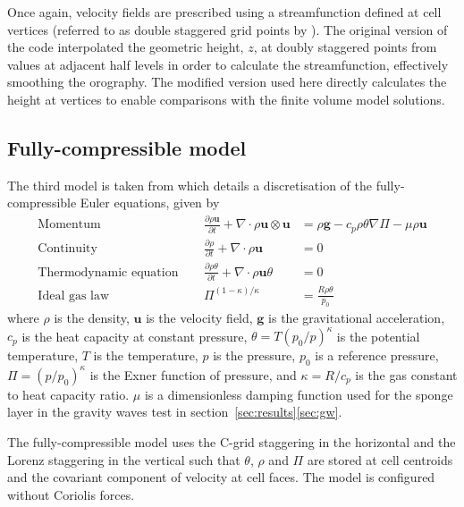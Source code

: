 \documentclass{ametsoc}
\begin{document}
Once again, velocity fields are prescribed using a streamfunction defined at cell vertices (referred to as double staggered grid points by \citet{schaer2002}).  The original version of the code interpolated the geometric height, $z$, at doubly staggered points from values at adjacent half levels in order to calculate the streamfunction, effectively smoothing the orography.  The modified version used here directly calculates the height at vertices to enable comparisons with the finite volume model solutions.

\subsection{Fully-compressible model}
\label{sec:euler-model}
The third model is taken from \citet{weller-shahrokhi2014} which details a discretisation of the fully-compressible Euler equations, given by
\begin{subequations}
\begin{align}
	\text{Momentum} &\ &\  	\frac{\partial \rho \mathbf{u}}{\partial t} + \nabla \cdot \rho \mathbf{u}\otimes\mathbf{u} &= \rho \mathbf{g} - c_p \rho \theta \nabla \Pi - \mu \rho \mathbf{u} \label{eq:momentum} \\
	\text{Continuity} &\ &\	\frac{\partial \rho}{\partial t} + \nabla \cdot \rho \mathbf{u} &= 0 \label{eq:cont} \\
	\text{Thermodynamic equation} &\ &\ \frac{\partial \rho \theta}{\partial t} + \nabla \cdot \rho \mathbf{u} \theta &= 0 \label{eq:theta} \\
	\text{Ideal gas law} &\ &\ \Pi^{(1 - \kappa)/\kappa} &= \frac{R \rho \theta}{p_0} \label{eq:state}
\end{align}
\end{subequations}
where \(\rho\) is the density, \(\mathbf{u}\) is the velocity field, \(\mathbf{g}\) is the gravitational acceleration, \(c_p\) is the heat capacity at constant pressure, \(\theta = T \left(p_0/p\right)^\kappa\) is the potential temperature, \(T\) is the temperature, \(p\) is the pressure, \(p_0\) is a reference pressure, \(\Pi = \left(p / p_0 \right)^\kappa\) is the Exner function of pressure, and \(\kappa = R/c_p\) is the gas constant to heat capacity ratio.  \(\mu\) is a dimensionless damping function used for the sponge layer in the gravity waves test in section~\ref{sec:results}\ref{sec:gw}.

The fully-compressible model uses the C-grid staggering in the horizontal and the Lorenz staggering in the vertical such that $\theta$, $\rho$ and $\Pi$ are stored at cell centroids and the covariant component of velocity at cell faces.  The model is configured without Coriolis forces.
\end{document}
